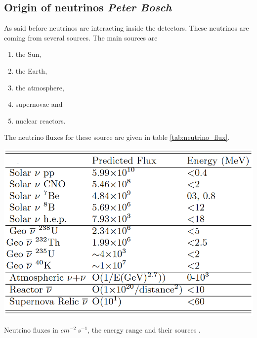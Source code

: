 \documentclass{article}
\begin{document}
\subsection{Origin of neutrinos \small{\textit{Peter Bosch}}}
As said before neutrinos are interacting inside the detectors. These neutrinos are coming from several sources. The main sources are
\begin{enumerate}
    \item the Sun,
    \item the Earth,
    \item the atmosphere,
    \item supernovae and
    \item nuclear reactors.
\end{enumerate}
The neutrino fluxes for these source are given in table \ref{tab:neutrino_flux}.
\begin{table}[]
    \centering
    \includegraphics[width=.8\textwidth]{Neutrino_fluxes.PNG}
    \caption{Neutrino fluxes in $cm^{-2}\ s^{-1}$, the energy range and their sources \cite{Monroe:2007xp}.}
    \label{tab:neutrino_flux}
\end{table}
\end{document}
